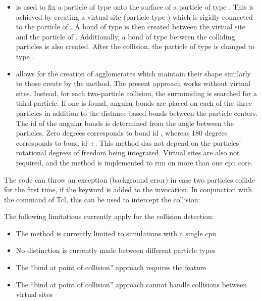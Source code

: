 \begin{itemize}
\item {} is used to fix a particle of type
   onto the surface of a particle of type . This
  is achieved by creating a virtual site (particle type )
  which is rigidly connected to the particle of . A bond of
  type  is then created between the virtual site and the
  particle of .  Additionally, a bond of type 
  between the colliding particles is also created.  After the collision,
  the particle of type  is changed to type .

\item {} allows for the creation of agglomerates
  which maintain their shape similarly to those create by the
   method. The present approach works
  without virtual sites. Instead, for each two-particle collision, the
  surrounding is searched for a third particle. If one is found, angular
  bonds are placed on each of the three particles in addition to the
  distance based bonds between the particle centers. The id of the
  angular bonds is determined from the angle between the particles. Zero
  degrees corresponds to bond id , whereas 180 degrees
  corresponds to bond id  +.  This method das not
  depend on the particles' rotational degrees of freedom being
  integrated. Virtual sites are also not required, and the method is
  implemented to run on more than one cpu core.
\end{itemize}

The code can throw an exception (background error) in case two
particles collide for the first time, if the  keyword
is added to the invocation. In conjunction with the 
command of Tcl, this can be used to intercept the collision:

The following limitations currently apply for the collision detection:
\begin{itemize}
\item The method is currently limited to simulations with a single cpu
\item No distinction is currently made between different particle types
\item The ``bind at point of collision'' approach requires the
   feature
\item The ``bind at point of collision'' approach cannot handle
  collisions between virtual sites
\end{itemize}


